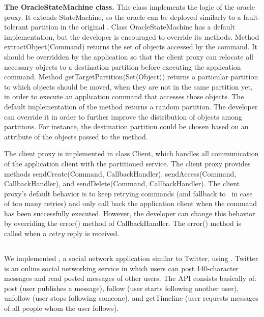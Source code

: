 \textbf{The OracleStateMachine class.} This class implements the logic of the oracle proxy. It extends StateMachine, so the oracle can be deployed similarly to a fault-tolerant partition in the original \ssmr{}. Class OracleStateMachine has a default implementation, but the developer is encouraged to override its methods. Method extractObject(Command) returns the set of objects accessed by the command. It should be overridden by the application so that the client proxy can relocate all necessary objects to a destination partition before executing the application command.
Method getTargetPartition(Set$\langle$Object$\rangle$) returns a particular partition to which objects should be moved, when they are not in the same partition yet, in order to execute an application command that accesses those objects. The default implementation of the method returns a random partition. The developer can override it in order to further improve the distribution of objects among partitions.
For instance, the destination partition could be chosen based on an attribute of the objects passed to the method.

The client proxy is implemented in class Client, which handles all communication of the application client with the partitioned service. The client proxy provides methods sendCreate(Command, CallbackHandler), sendAccess(Command, CallbackHandler), and sendDelete(Command, CallbackHandler). The client proxy's default behavior is to keep retrying commands (and fallback to \ssmr\ in case of too many retries) and only call back the application client when the command has been successfully executed.
However, the developer can change this behavior by overriding the error() method of CallbackHandler. The error() method is called when a $retry$ reply is received.


\subsection{\appname}

We implemented \appname{}, a social network application similar to Twitter, using \libname{}. Twitter is an online social networking service in which users can post 140-character messages and read posted messages of other users. The API consists basically of: post (user publishes a message), follow (user starts following another user), unfollow (user stops following someone), and getTimeline (user requests messages of all people whom the user follows).

